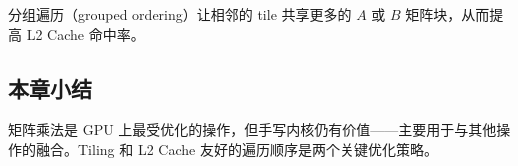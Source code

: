 分组遍历（grouped ordering）让相邻的 tile 共享更多的 $A$ 或 $B$ 矩阵块，从而提高 L2 Cache 命中率。

\subsection{本章小结}

矩阵乘法是 GPU 上最受优化的操作，但手写内核仍有价值——主要用于与其他操作的融合。Tiling 和 L2 Cache 友好的遍历顺序是两个关键优化策略。



